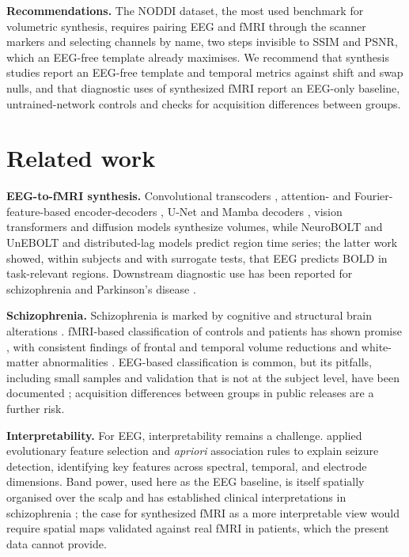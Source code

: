 \documentclass{article}
\begin{document}
\noindent\textbf{Recommendations.} The NODDI dataset, the most used benchmark for volumetric synthesis, requires pairing EEG and fMRI through the scanner markers and selecting channels by name, two steps invisible to SSIM and PSNR, which an EEG-free template already maximises. We recommend that synthesis studies report an EEG-free template and temporal metrics against shift and swap nulls, and that diagnostic uses of synthesized fMRI report an EEG-only baseline, untrained-network controls and checks for acquisition differences between groups.

\section{Related work}\label{section:related_work}

\noindent\textbf{EEG-to-fMRI synthesis.} Convolutional transcoders \cite{liu2019convolutional, liu2020latent}, attention- and Fourier-feature-based encoder-decoders \cite{calhas2022eeg}, U-Net and Mamba decoders \cite{roos2025brainwaves,he2025spec2vol}, vision transformers \cite{lanzino2024ntvit} and diffusion models \cite{yao2025catd} synthesize volumes, while NeuroBOLT and UnEBOLT \cite{li2024neurobolt,li2026unebolt} and distributed-lag models \cite{mehta2025time} predict region time series; the latter work showed, within subjects and with surrogate tests, that EEG predicts BOLD in task-relevant regions. Downstream diagnostic use has been reported for schizophrenia \cite{calhas2023medrxiv} and Parkinson's disease \cite{yao2025catd}.

\noindent\textbf{Schizophrenia.}\label{related_work:schizophrenia} Schizophrenia is marked by cognitive and structural brain alterations \cite{sui2018multimodal}. fMRI-based classification of controls and patients has shown promise \cite{de2019machine}, with consistent findings of frontal and temporal volume reductions \cite{chin2018recognition} and white-matter abnormalities \cite{cetin2020white}. EEG-based classification is common, but its pitfalls, including small samples and validation that is not at the subject level, have been documented \cite{barros2021advanced}; acquisition differences between groups in public releases are a further risk.

\noindent\textbf{Interpretability.}\label{related_work:interpretability} For EEG, interpretability remains a challenge. \citet{pinto2022interpretable} applied evolutionary feature selection and \textit{apriori} association rules to explain seizure detection, identifying key features across spectral, temporal, and electrode dimensions. Band power, used here as the EEG baseline, is itself spatially organised over the scalp and has established clinical interpretations in schizophrenia \cite{roach2008event,bates2009low}; the case for synthesized fMRI as a more interpretable view would require spatial maps validated against real fMRI in patients, which the present data cannot provide.
\end{document}
